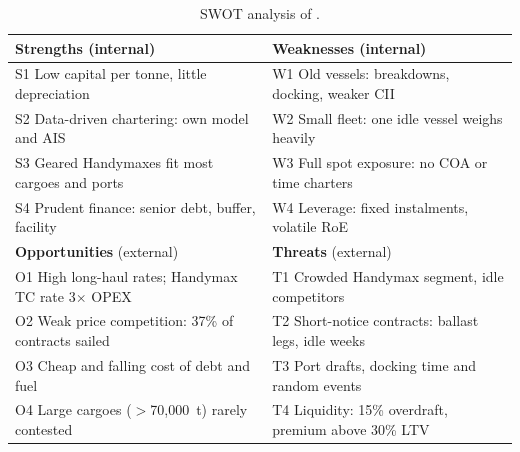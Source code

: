 \begin{table}[tbp]
  \centering\footnotesize
  \caption{SWOT analysis of \company{}.}
  \label{tab:swot}
  \begin{tabularx}{\textwidth}{@{}>{\raggedright\arraybackslash}X>{\raggedright\arraybackslash}X@{}}
    \toprule
    \textbf{Strengths} (internal) & \textbf{Weaknesses} (internal) \\
    \midrule
    S1 Low capital per tonne, little depreciation &
    W1 Old vessels: breakdowns, docking, weaker CII \\
    S2 Data-driven chartering: own model and AIS &
    W2 Small fleet: one idle vessel weighs heavily \\
    S3 Geared Handymaxes fit most cargoes and ports &
    W3 Full spot exposure: no COA or time charters \\
    S4 Prudent finance: senior debt, buffer, facility &
    W4 Leverage: fixed instalments, volatile RoE \\
    \midrule
    \textbf{Opportunities} (external) & \textbf{Threats} (external) \\
    \midrule
    O1 High long-haul rates; Handymax TC rate 3$\times$ OPEX &
    T1 Crowded Handymax segment, idle competitors \\
    O2 Weak price competition: 37\% of contracts sailed &
    T2 Short-notice contracts: ballast legs, idle weeks \\
    O3 Cheap and falling cost of debt and fuel &
    T3 Port drafts, docking time and random events \\
    O4 Large cargoes ($>$70,000~t) rarely contested &
    T4 Liquidity: 15\% overdraft, premium above 30\% LTV \\
    \bottomrule
  \end{tabularx}


\end{table}
